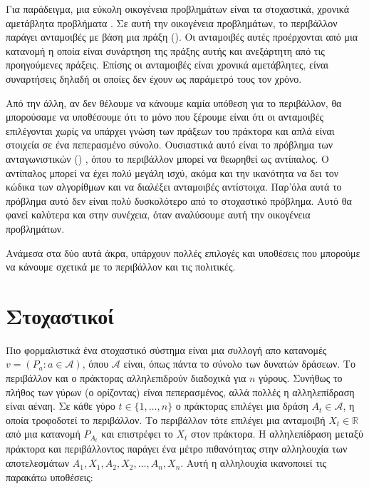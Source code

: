 Για παράδειγμα, μια εύκολη οικογένεια προβλημάτων είναι τα στοχαστικά, χρονικά αμετάβλητα προβλήματα .
Σε αυτή την οικογένεια προβλημάτων, το περιβάλλον παράγει ανταμοιβές με βάση μια πράξη (). Οι ανταμοιβές αυτές προέρχονται από μια
κατανομή η οποία είναι συνάρτηση της πράξης αυτής και ανεξάρτητη από τις προηγούμενες πράξεις. Επίσης οι ανταμοιβές είναι χρονικά αμετάβλητες,
είναι συναρτήσεις δηλαδή οι οποίες δεν έχουν ως παράμετρό τους τον χρόνο.

Από την άλλη, αν δεν θέλουμε να κάνουμε καμία υπόθεση για το περιβάλλον, θα μπορούσαμε να υποθέσουμε ότι το μόνο που ξέρουμε είναι ότι οι ανταμοιβές
επιλέγονται χωρίς να υπάρχει γνώση των πράξεων του πράκτορα και απλά είναι στοιχεία σε ένα πεπερασμένο σύνολο.
Ουσιαστικά αυτό είναι το πρόβλημα των ανταγωνιστικών () , όπου το περιβάλλον μπορεί να θεωρηθεί ως αντίπαλος.
Ο αντίπαλος μπορεί να έχει πολύ μεγάλη ισχύ, ακόμα και την ικανότητα να δει τον κώδικα των αλγορίθμων και να διαλέξει ανταμοιβές αντίστοιχα.
Παρ'όλα αυτά το πρόβλημα αυτό δεν είναι πολύ δυσκολότερο από το στοχαστικό πρόβλημα. Αυτό θα φανεί καλύτερα και στην συνέχεια, όταν αναλύσουμε αυτή
την οικογένεια προβλημάτων.

Ανάμεσα στα δύο αυτά άκρα, υπάρχουν πολλές επιλογές και υποθέσεις που μπορούμε να κάνουμε σχετικά με το περιβάλλον και τις πολιτικές.

\section{Στοχαστικοί }

Πιο φορμαλιστικά ένα στοχαστικό σύστημα  είναι μια συλλογή απο κατανομές $v = (P_a : a \in \mathcal{A})$, όπου $\mathcal{A}$ είναι, όπως πάντα το σύνολο των δυνατών δράσεων. Το περιβάλλον και ο πράκτορας αλληλεπιδρούν διαδοχικά για $n$ γύρους. Συνήθως το πλήθος των γύρων (ο ορίζοντας) είναι πεπερασμένος, αλλά πολλές η αλληλεπίδραση είναι αέναη. Σε κάθε γύρο $t \in \{1, \ldots, n\}$ ο πράκτορας επιλέγει μια δράση $A_t \in \mathcal{A}$, η οποία τροφοδοτεί το περιβάλλον. Το περιβάλλον τότε επιλέγει μια ανταμοιβή $X_t \in \mathbb{R}$ από μια κατανομή $P_{A_t}$ και επιστρέφει το $X_t$ στον πράκτορα. Η αλληλεπίδραση
μεταξύ πράκτορα και περιβάλλοντος παράγει ένα μέτρο πιθανότητας στην αλληλουχία των αποτελεσμάτων $A_1, X_1, A_2, X_2, \ldots, A_n, X_n$. Αυτή η αλληλουχία ικανοποιεί τις παρακάτω υποθέσεις:

